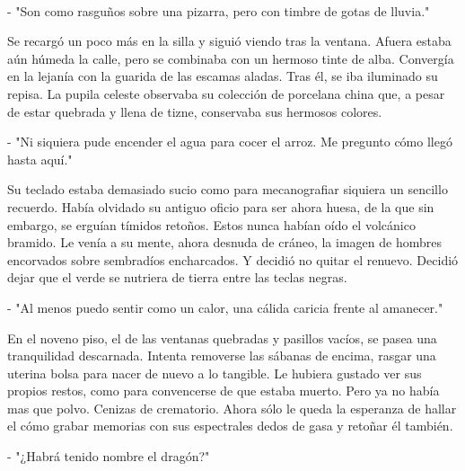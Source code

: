 \\[0.1cm]

- "Son como rasguños sobre una pizarra, pero con timbre de gotas de lluvia."

Se recargó un poco más en la silla y siguió viendo tras la ventana. Afuera estaba aún húmeda la calle, pero se combinaba con un hermoso tinte de alba. Convergía en la lejanía con la guarida de las escamas aladas. Tras él, se iba iluminado su repisa. La pupila celeste observaba su colección de porcelana china que, a pesar de estar quebrada y llena de tizne, conservaba sus hermosos colores.

- "Ni siquiera pude encender el agua para cocer el arroz. Me pregunto cómo llegó hasta aquí."

Su teclado estaba demasiado sucio como para mecanografiar siquiera un sencillo recuerdo. Había olvidado su antiguo oficio para ser ahora huesa, de la que sin embargo, se erguían tímidos retoños. Estos nunca habían oído el volcánico bramido. Le venía a su mente, ahora desnuda de cráneo, la imagen de hombres encorvados sobre sembradíos encharcados. Y decidió no quitar el renuevo. Decidió dejar que el verde se nutriera de tierra entre las teclas negras.

- "Al menos puedo sentir como un calor, una cálida caricia frente al amanecer."

En el noveno piso, el de las ventanas quebradas y pasillos vacíos, se pasea una tranquilidad descarnada. Intenta removerse las sábanas de encima, rasgar una uterina bolsa para nacer de nuevo a lo tangible. Le hubiera gustado ver sus propios restos, como para convencerse de que estaba muerto. Pero ya no había mas que polvo. Cenizas de crematorio. Ahora sólo le queda la esperanza de hallar el cómo grabar memorias con sus espectrales dedos de gasa y retoñar él también.

- "¿Habrá tenido nombre el dragón?"\\[0.5cm]